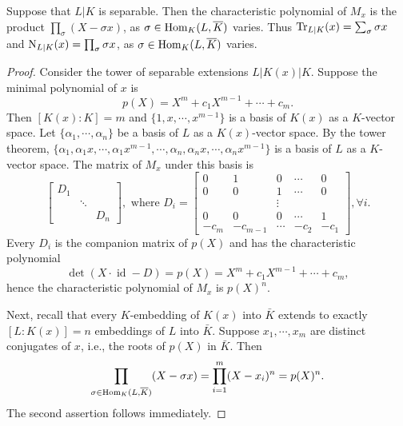 \begin{proposition}\label{proposition:norm_trace_formula_embeddings}
  Suppose that $L|K$ is separable.
  Then the characteristic polynomial of $M_{x}$ is the product $\prod_{\sigma} (X - \sigma x)$, as $\sigma \in \operatorname{Hom}_{K}(L,\overline K)$ varies.
  Thus $\operatorname{Tr}_{L|K}(x) = \sum_{\sigma} \sigma x$ and $\operatorname{N}_{L|K}(x) = \prod_{\sigma} \sigma x$, as $\sigma \in \operatorname{Hom}_{K}(L,\overline K)$ varies.
\end{proposition}
\begin{proof}
  Consider the tower of separable extensions $L|K(x)|K$. Suppose the minimal polynomial of $x$ is
  \[p(X) = X^m + c_1X^{m-1} + \cdots + c_m.\]
  Then $[K(x): K] = m$ and $\{1, x, \cdots, x^{m-1}\}$ is a basis of $K(x)$ as a $K$-vector space.
  Let $\{\alpha_1, \cdots, \alpha_n\}$ be a basis of $L$ as a $K(x)$-vector space.
  By the tower theorem, $\{\alpha_{1}, \alpha_{1} x, \cdots, \alpha_{1} x^{m-1} , \cdots , \alpha_{n}, \alpha_{n} x, \cdots, \alpha_{n} x^{m-1}\}$ is a basis of $L$ as a $K$-vector space.
  The matrix of $M_x$ under this basis is
  \begin{equation*}
    \begin{bmatrix}
      D_1 & & \\
      & \ddots & \\
      & & D_n
    \end{bmatrix}, \text{ where } D_i = 
    \begin{bmatrix}
      0 & 1 & 0 &\cdots& 0 \\
      0 & 0 & 1 &\cdots& 0 \\
       &  & \vdots & & \\
      0 & 0 & 0 &\cdots& 1 \\
      -c_m & -c_{m-1} & \cdots & -c_2 &-c_1
    \end{bmatrix}, \forall i.
  \end{equation*}
  Every $D_i$ is the companion matrix of $p(X)$ and has the characteristic polynomial
  \[\det(X\cdot \operatorname{id} - D) = p(X) = X^m + c_1X^{m-1} + \cdots + c_m,\]
  hence the characteristic polynomial of $M_{x}$ is $p(X)^n$.
  
  Next, recall that every $K$-embedding of $K(x)$ into $\bar K$ extends to exactly $[L:K(x)] = n$ embeddings of $L$ into $\bar K$.
  Suppose $x_1, \cdots, x_m$ are distinct conjugates of $x$, i.e., the roots of $p(X)$ in $\bar K$.
  Then
  \[\prod_{\sigma\in \operatorname{Hom}_{K}(L,\overline K)} (X - \sigma x) = \prod_{i=1}^m(X - x_i)^n = p(X)^n.\]
  The second assertion follows immediately.
\end{proof}

